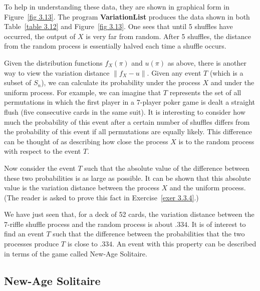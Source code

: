\par To help in understanding these data, they are shown in graphical form in
Figure~\ref{fig 3.13}.  The program {\bf VariationList} produces the
data shown in both Table~\ref{table 3.12} and Figure~\ref{fig 3.13}.  One sees that until 5 shuffles
have occurred, the output of
$X$ is very far from random.  After 5 shuffles, the distance from the random process is
essentially halved each time a shuffle occurs.
\par Given the distribution functions $f_X(\pi)$ and $u(\pi)$ as above, there is
another way to view the variation distance $\parallel f_X - u\parallel$.  Given any
event $T$ (which is a subset of
$S_n$), we can calculate its probability under the process $X$ and under the uniform
process.  For example, we can imagine that $T$ represents the set of all permutations
in which the first player in a 7-player poker game is dealt a straight flush (five
consecutive cards in the same suit).  It is interesting to consider how much the
probability of this event after a certain number of shuffles differs from the
probability of this event if all permutations are equally likely.  This difference can
be thought of as describing how close the process $X$ is to the random process with
respect to the event $T$.
\par Now consider the event $T$ such that the absolute value of the difference between
these two probabilities is as large as possible.  It can be shown that this absolute
value is the variation distance between the process $X$ and the uniform process.  (The
reader is asked to prove this fact in Exercise~\ref{exer 3.3.4}.)
\par We have just seen that, for a deck of 52 cards, the variation distance between
the 7-riffle shuffle process and the random process is about $.334$.  It is of 
interest to find an event $T$ such that the difference between the probabilities
that the two processes produce $T$ is close to
$.334$.  An event with this property can be described in terms of the game called
New-Age Solitaire.  

\subsection*{New-Age Solitaire}

